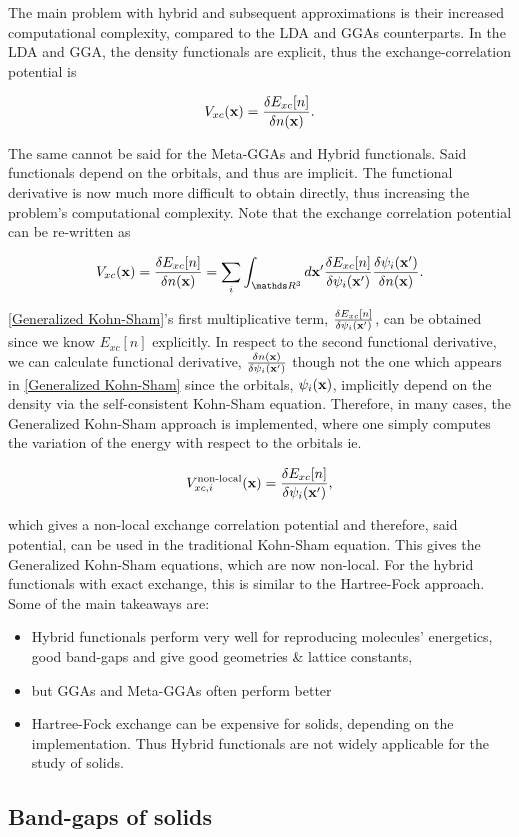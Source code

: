 \documentclass{homework}
\begin{document}
The main problem with hybrid and subsequent approximations is their increased computational complexity, compared to the LDA and GGAs counterparts. In the LDA and GGA, the density functionals are explicit, thus the exchange-correlation potential is 

$$
V_{xc}({\bf x}) = \frac{\delta E_{xc}[n]}{\delta n({\bf x})}.
$$

The same cannot be said for the Meta-GGAs and Hybrid functionals. Said functionals depend on the orbitals, and thus are implicit. The functional derivative is now much more difficult to obtain directly, thus increasing the problem's computational complexity. Note that the exchange correlation potential can be re-written as 

\begin{align}
V_{xc}(\x) = \frac{\delta E_{xc}[n]}{\delta n(\x)} = \sum_{i} \int_{\R^3} d\x' \frac{\delta E_{xc}[n]}{\delta \psi_i (\x')}\frac{\delta \psi_i (\x')}{\delta n(\x)}.
\label{Generalized Kohn-Sham}
\end{align}

\eqref{Generalized Kohn-Sham}'s first multiplicative term, $ \frac{\delta E_{xc}[n]}{\delta \psi_i ({\bf x}')}$, can be obtained since we know $E_{xc}[n]$ explicitly. In respect to the second functional derivative, we can calculate functional derivative, $\frac{\delta n({\bf x})}{\delta \psi_i ({\bf x}')}$ though not the one which appears in \eqref{Generalized Kohn-Sham} since the orbitals, $\psi_i({\bf x})$, implicitly depend on the density via the self-consistent Kohn-Sham equation. Therefore, in many cases, the Generalized Kohn-Sham approach is implemented, where one simply computes the variation of the energy with respect to the orbitals ie. 

$$
V_{xc, i}^{\textnormal{non-local}} ({\bf x}) = \frac{\delta E_{xc}[n]}{\delta \psi_i ({\bf x}')},
$$

which gives a non-local exchange correlation potential and therefore, said potential, can be used in the traditional Kohn-Sham equation. This gives the Generalized Kohn-Sham equations, which are now non-local. For the hybrid functionals with exact exchange, this is similar to the Hartree-Fock approach. \\

Some of the main takeaways are: 

\begin{itemize}
    \item Hybrid functionals perform very well for reproducing molecules' energetics, good band-gaps and give good geometries \& lattice constants, 
    \item but GGAs and Meta-GGAs often perform better
    \item Hartree-Fock exchange can be expensive for solids, depending on the implementation. Thus Hybrid functionals are not widely applicable for the study of solids. 
\end{itemize}

\subsection{Band-gaps of solids}
\end{document}
